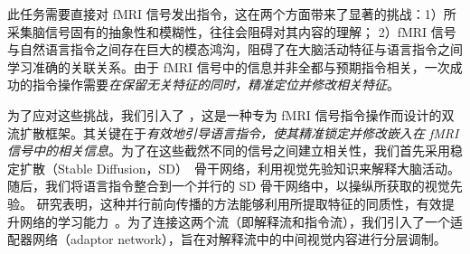 此任务需要直接对 fMRI 信号发出指令，这在两个方面带来了显著的挑战：1）所采集脑信号固有的抽象性和模糊性，往往会阻碍对其内容的理解；
2）fMRI 信号与自然语言指令之间存在巨大的模态鸿沟，阻碍了在大脑活动特征与语言指令之间学习准确的关联关系。由于 fMRI 信号中的信息并非全都与预期指令相关，一次成功的指令操作需要\emph{在保留无关特征的同时，精准定位并修改相关特征}。

为了应对这些挑战，我们引入了 \textbf{\model{}}，这是一种专为 fMRI 信号指令操作而设计的双流扩散框架。其关键在于\emph{有效地引导语言指令，使其精准锁定并修改嵌入在 fMRI 信号中的相关信息}。为了在这些截然不同的信号之间建立相关性，我们首先采用稳定扩散（Stable Diffusion，SD）~\cite{rombach2022high}骨干网络，利用视觉先验知识来解释大脑活动。随后，我们将语言指令整合到一个并行的 SD 骨干网络中，以操纵所获取的视觉先验。
研究表明，这种并行前向传播的方法能够利用所提取特征的同质性，有效提升网络的学习能力~\cite{zhang2023adding}。为了连接这两个流（即解释流和指令流），我们引入了一个适配器网络（adaptor network），旨在对解释流中的中间视觉内容进行分层调制。

